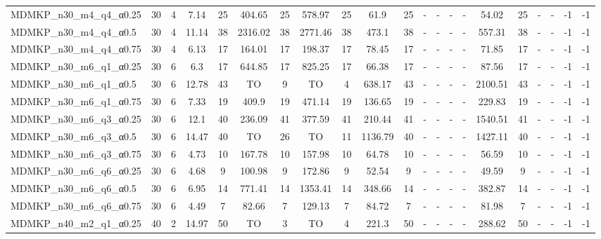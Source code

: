 \begin{sidewaystable}[!ht]
{\begin{tabular}{lcccccccccccccccccccc}
MDMKP\_n30\_m4\_q4\_α0.25 & 30 & 4 &  \textcolor{blue2}{7.14} & 25 & 404.65 & 25 & 578.97 & 25 & 61.9 & 25 &  - &  - &  - &  - & 54.02 & 25 &  - &  - & -1 & -1 \\
MDMKP\_n30\_m4\_q4\_α0.5 & 30 & 4 &  \textcolor{blue2}{11.14} & 38 & 2316.02 & 38 & 2771.46 & 38 & 473.1 & 38 &  - &  - &  - &  - & 557.31 & 38 &  - &  - & -1 & -1 \\
MDMKP\_n30\_m4\_q4\_α0.75 & 30 & 4 &  \textcolor{blue2}{6.13} & 17 & 164.01 & 17 & 198.37 & 17 & 78.45 & 17 &  - &  - &  - &  - & 71.85 & 17 &  - &  - & -1 & -1 \\
MDMKP\_n30\_m6\_q1\_α0.25 & 30 & 6 &  \textcolor{blue2}{6.3} & 17 & 644.85 & 17 & 825.25 & 17 & 66.38 & 17 &  - &  - &  - &  - & 87.56 & 17 &  - &  - & -1 & -1 \\
MDMKP\_n30\_m6\_q1\_α0.5 & 30 & 6 &  \textcolor{blue2}{12.78} & 43 & TO & 9 & TO & 4 & 638.17 & 43 &  - &  - &  - &  - & 2100.51 & 43 &  - &  - & -1 & -1 \\
MDMKP\_n30\_m6\_q1\_α0.75 & 30 & 6 &  \textcolor{blue2}{7.33} & 19 & 409.9 & 19 & 471.14 & 19 & 136.65 & 19 &  - &  - &  - &  - & 229.83 & 19 &  - &  - & -1 & -1 \\
MDMKP\_n30\_m6\_q3\_α0.25 & 30 & 6 &  \textcolor{blue2}{12.1} & 40 & 236.09 & 41 & 377.59 & 41 & 210.44 & 41 &  - &  - &  - &  - & 1540.51 & 41 &  - &  - & -1 & -1 \\
MDMKP\_n30\_m6\_q3\_α0.5 & 30 & 6 &  \textcolor{blue2}{14.47} & 40 & TO & 26 & TO & 11 & 1136.79 & 40 &  - &  - &  - &  - & 1427.11 & 40 &  - &  - & -1 & -1 \\
MDMKP\_n30\_m6\_q3\_α0.75 & 30 & 6 &  \textcolor{blue2}{4.73} & 10 & 167.78 & 10 & 157.98 & 10 & 64.78 & 10 &  - &  - &  - &  - & 56.59 & 10 &  - &  - & -1 & -1 \\
MDMKP\_n30\_m6\_q6\_α0.25 & 30 & 6 &  \textcolor{blue2}{4.68} & 9 & 100.98 & 9 & 172.86 & 9 & 52.54 & 9 &  - &  - &  - &  - & 49.59 & 9 &  - &  - & -1 & -1 \\
MDMKP\_n30\_m6\_q6\_α0.5 & 30 & 6 &  \textcolor{blue2}{6.95} & 14 & 771.41 & 14 & 1353.41 & 14 & 348.66 & 14 &  - &  - &  - &  - & 382.87 & 14 &  - &  - & -1 & -1 \\
MDMKP\_n30\_m6\_q6\_α0.75 & 30 & 6 &  \textcolor{blue2}{4.49} & 7 & 82.66 & 7 & 129.13 & 7 & 84.72 & 7 &  - &  - &  - &  - & 81.98 & 7 &  - &  - & -1 & -1 \\
MDMKP\_n40\_m2\_q1\_α0.25 & 40 & 2 &  \textcolor{blue2}{14.97} & 50 & TO & 3 & TO & 4 & 221.3 & 50 &  - &  - &  - &  - & 288.62 & 50 &  - &  - & -1 & -1 \\

\end{tabular}}
\end{sidewaystable}
